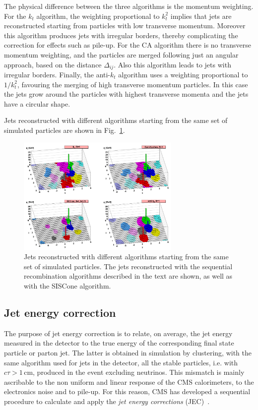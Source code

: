 The physical difference between the three algorithms is the momentum weighting. For the $k_t$ algorithm, the weighting proportional to $k_t^2$ implies that jets are reconstructed starting from particles with low transverse momentum. Moreover this algorithm produces jets with irregular borders, thereby complicating the correction for effects such as pile-up. For the CA algorithm there is no transverse momentum weighting, and the particles are merged following just an angular approach, based on the distance $\Delta_{ij}$. Also this algorithm leads to jets with irregular borders. Finally, the anti-$k_t$ algorithm uses a weighting proportional to $1/k_t^2$, favouring the merging of high transverse momentum particles. In this case the jets grow around the particles with highest transverse momenta and the jets have a circular shape. 

Jets reconstructed with different algorithms starting from the same set of simulated particles are shown in Fig.~\ref{fig:jets}.

\begin{figure}[htb]
\centering
\includegraphics[width=0.7\textwidth]{images/jets.png}
\caption{Jets reconstructed with different algorithms starting from the same set of simulated particles. The jets reconstructed with the sequential recombination algorithms described in the text are shown, as well as with the SISCone algorithm.}\label{fig:jets}
\end{figure}

\subsection{Jet energy correction}\label{sec:jec}

The purpose of jet energy correction is to relate, on average, the jet energy measured in the detector to the true energy of the corresponding final state particle or parton jet. The latter is obtained in simulation by clustering, with the same algorithm used for jets in the detector, all the stable particles, i.e. with $c\tau > 1$\,cm, produced in the event excluding neutrinos. This mismatch is mainly ascribable to the non uniform and linear response of the CMS calorimeters, to the electronics noise and to pile-up. For this reason, CMS has developed a sequential procedure to calculate and apply the \emph{jet energy corrections} (JEC)~\cite{Chatrchyan:2011ds}.

